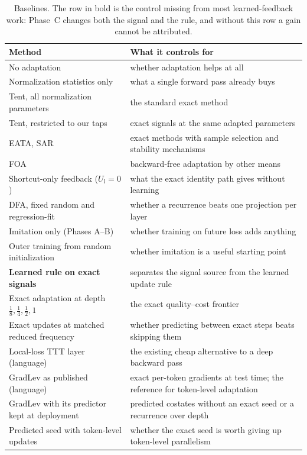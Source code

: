 \documentclass{article}
\begin{document}
\begin{table}[ht]
\centering
\small
\begin{tabular}{L{5.6cm} L{9.4cm}}
\toprule
Method & What it controls for \\
\midrule
No adaptation & whether adaptation helps at all \\
Normalization statistics only \parencite{schneider2020covariate} & what a single forward pass already buys \\
Tent, all normalization parameters & the standard exact method \\
Tent, restricted to our taps & exact signals at the same adapted parameters \\
EATA, SAR & exact methods with sample selection and stability mechanisms \\
FOA & backward-free adaptation by other means \\
Shortcut-only feedback ($U_l = 0$) & what the exact identity path gives without learning \\
DFA, fixed random and regression-fit & whether a recurrence beats one projection per layer \\
Imitation only (Phases A--B) & whether training on future loss adds anything \\
Outer training from random initialization & whether imitation is a useful starting point \\
\textbf{Learned rule on exact signals} & separates the signal source from the learned update rule \\
Exact adaptation at depth $\tfrac18, \tfrac14, \tfrac12, 1$ & the exact quality--cost frontier \\
Exact updates at matched reduced frequency & whether predicting between exact steps beats skipping them \\
Local-loss TTT layer (language) & the existing cheap alternative to a deep backward pass \\
GradLev as published (language) & exact per-token gradients at test time; the reference for token-level adaptation \\
GradLev with its predictor kept at deployment & predicted costates without an exact seed or a recurrence over depth \\
Predicted seed with token-level updates & whether the exact seed is worth giving up token-level parallelism \\
\bottomrule
\end{tabular}
\caption{Baselines. The row in bold is the control missing from most learned-feedback
work: Phase~C changes both the signal and the rule, and without this row a
gain cannot be attributed.}
\label{tab:baselines}
\end{table}
\end{document}
